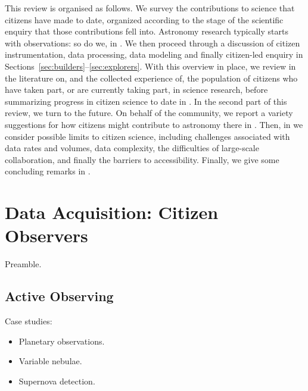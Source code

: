 \documentclass{ar2e}
\begin{document}
This review is organised as follows. We survey the contributions to science that
citizens have made to date, organized according to the stage of the scientific
enquiry that those contributions fell into. Astronomy research typically starts
with observations: so do we, in . We then proceed through a
discussion of citizen instrumentation, data processing, data modeling and
finally citizen-led enquiry in 
Sections~\ref{sec:builders}--\ref{sec:explorers}. With this overview in place,
we review in  the literature on, and the collected experience
of, the population of citizens who have taken part, or are currently taking
part, in science research, before summarizing progress in citizen science to
date in . In the second part of this review, we turn to the
future. On behalf of the community, we report a variety suggestions for how
citizens might contribute to astronomy there in . Then, in 
 we consider possible limits to citizen science, including
challenges associated with data rates and volumes, data complexity, the
difficulties of large-scale collaboration, and finally the barriers to
accessibility. Finally, we give some concluding remarks in
.



\section{Data Acquisition: Citizen Observers}
\label{sec:observers}

Preamble.


\subsection{Active Observing}
\label{sec:observers:active}

Case studies:
\begin{itemize}
\item Planetary observations.
\item Variable nebulae.
\item Supernova detection.
\end{itemize}

\end{document}
